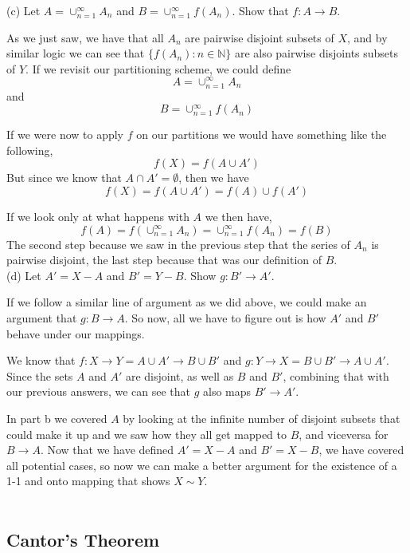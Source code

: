(c) Let $A =  \cup^{\infty}_{n=1} A_n$ and $B =  \cup^{\infty}_{n=1} f(A_n)$.
Show that $f: A \rightarrow B$.

As we just saw, we have that all $A_n$ are pairwise disjoint subsets of $X$, and by similar logic we can see that
$\{ f(A_n) : n\in\mathbb{N} \}$ are also pairwise disjoints subsets of $Y$.
If we revisit our partitioning scheme, we could define
$$
A = \cup^{\infty}_{n=1} A_n
$$
and
$$
B = \cup^{\infty}_{n=1} f(A_n)
$$

If we were now to apply $f$ on our partitions we would have something like the following,
$$
f(X) = f\left(
    A \cup A'
\right)
$$
But since we know that $A \cap A' = \emptyset$, then we have
$$
f(X) = f\left(   A \cup A' \right) =
    f(A) \cup f(A')
$$

If we look only at what happens with $A$ we then have,
$$
f(A) = f\left( \cup^{\infty}_{n=1} A_n \right) =
    \cup^{\infty}_{n=1} f(A_n) =
    f(B)
$$
The second step because we saw in the previous step that the series of $A_n$ is pairwise disjoint, the last step because
that was our definition of $B$.
\\

(d) Let $A' = X-A$ and $B' = Y-B$. Show $g: B' \rightarrow A'$.

If we follow a similar line of argument as we did above, we could make an argument that
$g: B\rightarrow A$.
So now, all we have to figure out is how $A'$ and $B'$ behave under our mappings.

We know that $f: X\rightarrow Y = A\cup A' \rightarrow B\cup B'$
and $g: Y \rightarrow X = B\cup B' \rightarrow A\cup A'$.
Since the sets $A$ and $A'$ are disjoint, as well as $B$ and $B'$, combining that with our previous answers,
we can see that $g$ also maps $B' \rightarrow A'$.

In part b we covered $A$ by looking at the infinite number of disjoint subsets that could make it up and we saw how
they all get mapped to $B$, and viceversa for $B \rightarrow A$.
Now that we have defined $A' = X-A$ and $B' = X-B$, we have covered all potential cases, so now we can
make a better argument for the existence of a 1-1 and onto mapping that shows $X \sim Y$.
\\~\\





\subsection{Cantor's Theorem}

